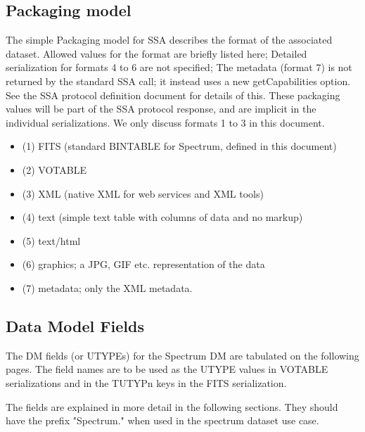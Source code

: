 \documentclass[11pt]{article}
\begin{document}
\subsection{Packaging model}

The simple Packaging model for SSA 
describes the format of the associated dataset.
Allowed values for the format are briefly listed here;
Detailed serialization for
formats 4 to 6 are not specified;
The metadata (format 7)
is not returned by the standard SSA call; it instead uses a new getCapabilities option. 
See the SSA protocol definition document for details of this.
These packaging values will be part of the SSA protocol response,
and are implicit in the individual serializations. We only discuss formats 1 to 3
in this document.



\colorbox{ipink}{
\begin{minipage}{0.9\textwidth}
\begin{itemize}
\item (1) FITS (standard BINTABLE for Spectrum, defined in this document)
\item (2) VOTABLE  
\item (3) XML  (native XML for web services and XML tools)
\item (4) text  (simple text table with columns of data and no markup)
\item (5) text/html
\item (6) graphics; a JPG, GIF etc. representation of the data
\item (7) metadata; only the XML metadata.

\end{itemize}
\end{minipage}
}

\subsection{Data Model Fields}

The DM fields (or UTYPEs) for the Spectrum DM are tabulated on the following 
pages. The field names are to be used as the UTYPE values in VOTABLE serializations
and in the TUTYPn keys in the FITS serialization.

The fields are explained in more detail in the following
sections. They should have the prefix "Spectrum." when used in the spectrum dataset use case.
\end{document}
